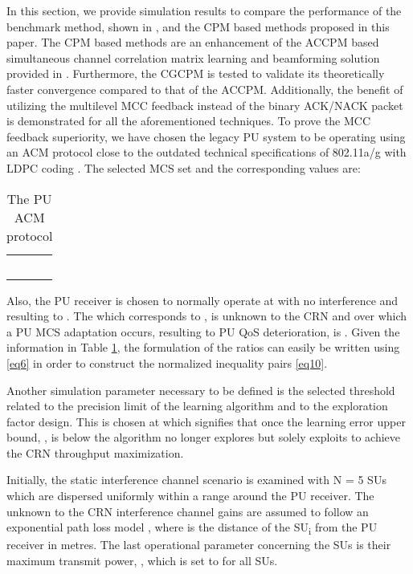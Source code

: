 \documentclass[journal]{IEEEtran}
\begin{document}
In this section, we provide simulation results to compare the performance of the benchmark method, shown in \cite{biban80}, and the CPM based methods proposed in this paper. The CPM based methods are an enhancement of the ACCPM based simultaneous channel correlation matrix learning and beamforming solution provided in \cite{biban73}. Furthermore, the CGCPM is tested to validate its theoretically faster convergence compared to that of the ACCPM. Additionally, the benefit of utilizing the multilevel MCC feedback instead of the binary ACK/NACK packet is demonstrated for all the aforementioned techniques. To prove the MCC feedback superiority, we have chosen the legacy PU system to be operating using an ACM protocol close to the outdated technical specifications of 802.11a/g with LDPC coding \cite{biban92, biban93}. The selected MCS set and the corresponding  values are:

\begin{table}[!h]
\caption{The PU ACM protocol}
\centering
\begin{tabular}{|| c || c ||}
\hline
 &  \\ \hline
 &  \\
\hline
 &  \\
\hline
 &  \\
\hline
 &  \\
\hline
 &  \\
\hline
\end{tabular}
\label{table:1}
\end{table}
Also, the PU receiver is chosen to normally operate at  with no interference and  resulting to . The  which corresponds to , is unknown to the CRN and over which a PU MCS adaptation occurs, resulting to PU QoS deterioration, is . Given the information in Table \ref{table:1}, the formulation of the  ratios can easily be written using \eqref{eq6} in order to construct the normalized inequality pairs \eqref{eq10}.

Another simulation parameter necessary to be defined is the selected threshold  related to the precision limit of the learning algorithm and to the exploration factor design. This is chosen at  which signifies that once the learning error upper bound, , is below  the algorithm no longer explores but solely exploits to achieve the CRN throughput maximization.

Initially, the static interference channel scenario is examined with N = 5 SUs which are dispersed uniformly within a  range around the PU receiver. The unknown to the CRN interference channel gains are assumed to follow an exponential path loss model , where  is the distance of the SU\textsubscript{i} from the PU receiver in metres. The last operational parameter concerning the SUs is their maximum transmit power, , which is set to  for all SUs.
\end{document}
